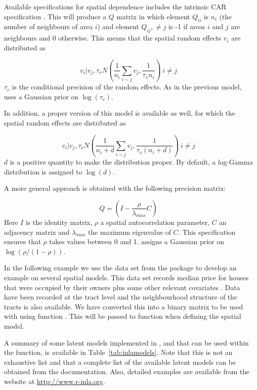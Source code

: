 \documentclass[article]{jss}
\begin{document}
Available specifications for spatial dependence includes the intrinsic CAR
specification \citep{besagetal:1991}. This will produce a $Q$ matrix in which
element $Q_{ii}$ is $n_i$ (the number of neighbours of area $i$) and element
$Q_{ij},\neq j$ is -1 if areas $i$ and $j$ are neighbours and 0 otherwise. This
means that the spatial random effects $v_i$ are distributed as

$$
v_i|v_j,\tau_v N( \frac{1}{n_i}\sum_{i\sim j} v_j, \frac{1}{\tau_vn_i})\ i\neq j
$$
\noindent
$\tau_v$ is the conditional precision of the random effects. As in the previous
model,  uses a Gaussian prior on $\log(\tau_v)$.

In addition, a proper version of this model is available as well,
for which the spatial random effects are distributed as

$$
v_i|v_j,\tau_v N( \frac{1}{n_i+d}\sum_{i\sim j} v_j, \frac{1}{\tau_v(n_i+d)})\ i\neq j
$$
\noindent
$d$ is a positive quantity to make the distribution proper. By default,
a log-Gamma distribution is assigned to $\log(d)$.

A more general approach is obtained  with the following precision
matrix:

$$
Q = (I - \frac{\rho}{\lambda_{max}}C)
$$
\noindent
Here $I$ is the identity matrix, $\rho$ a spatial autocorrelation parameter,
$C$ an adjacency matrix and $\lambda_{max}$ the maximum eigenvalue of $C$.
This specification ensures that $\rho$ takes values between 0 and 1.
 assigns a Gaussian prior on $\log(\rho/(1-\rho))$.

In the following example we use the  data set from the
 package  to develop an example on several spatial
models.  This data set  records median price for houses that were occupied by
their owners plus some other relevant covariates \citep[see,][for
details]{HarrisonRubinfeld:1978}. Data have been recorded at the tract level
and the neighbourhood structure of the tracts is also available.
We have converted this into a binary matrix to be used with 
using function . This will be passed to function  when
defining the spatial model.

A summary of some latent models implemented in , and that can be
used within the  function, is available in
Table~\ref{tab:inlamodels}. Note that this is not an exhaustive list and that a
complete list of the available latent models can be obtained from the
 documentation. Also, detailed examples are available from the
 website at \url{http://www.r-inla.org}.
\end{document}

